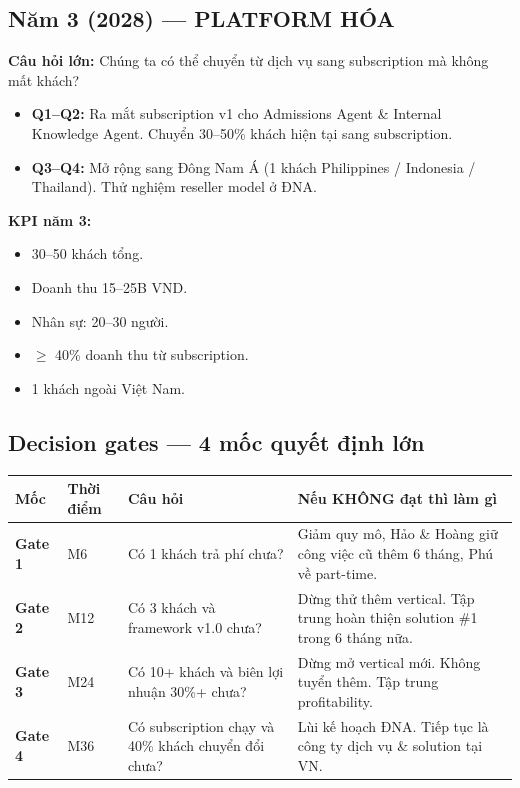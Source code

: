 \documentclass[11pt,a4paper]{article}
\begin{document}
\subsection{Năm 3 (2028) — PLATFORM HÓA}

\textbf{Câu hỏi lớn:} Chúng ta có thể chuyển từ dịch vụ sang subscription mà không mất khách?

\begin{itemize}
\item \textbf{Q1--Q2:} Ra mắt subscription v1 cho Admissions Agent \& Internal Knowledge Agent. Chuyển 30--50\% khách hiện tại sang subscription.
\item \textbf{Q3--Q4:} Mở rộng sang Đông Nam Á (1 khách Philippines / Indonesia / Thailand). Thử nghiệm reseller model ở ĐNA.
\end{itemize}

\textbf{KPI năm 3:}
\begin{itemize}
\item 30--50 khách tổng.
\item Doanh thu 15--25B VND.
\item Nhân sự: 20--30 người.
\item $\geq$ 40\% doanh thu từ subscription.
\item 1 khách ngoài Việt Nam.
\end{itemize}

\subsection{Decision gates — 4 mốc quyết định lớn}

\begin{tabularx}{\linewidth}{@{}p{1.5cm} p{3cm} X X@{}}
\toprule
\textbf{Mốc} & \textbf{Thời điểm} & \textbf{Câu hỏi} & \textbf{Nếu KHÔNG đạt thì làm gì} \\
\midrule
\textbf{Gate 1} & M6 & Có 1 khách trả phí chưa? & Giảm quy mô, Hảo \& Hoàng giữ công việc cũ thêm 6 tháng, Phú về part-time. \\
\textbf{Gate 2} & M12 & Có 3 khách và framework v1.0 chưa? & Dừng thử thêm vertical. Tập trung hoàn thiện solution \#1 trong 6 tháng nữa. \\
\textbf{Gate 3} & M24 & Có 10+ khách và biên lợi nhuận 30\%+ chưa? & Dừng mở vertical mới. Không tuyển thêm. Tập trung profitability. \\
\textbf{Gate 4} & M36 & Có subscription chạy và 40\% khách chuyển đổi chưa? & Lùi kế hoạch ĐNA. Tiếp tục là công ty dịch vụ \& solution tại VN. \\
\bottomrule
\end{tabularx}
\end{document}
